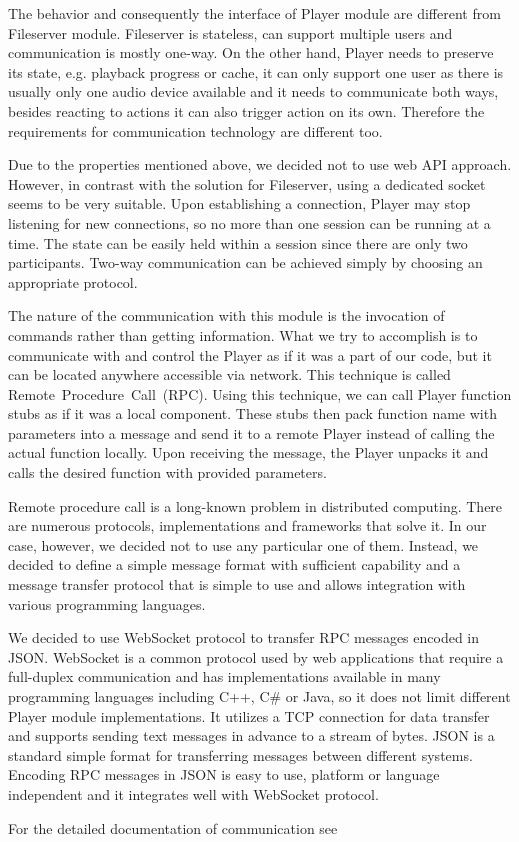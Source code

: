 The behavior and consequently the interface of Player module are different from Fileserver module. Fileserver is stateless, can support multiple users and communication is mostly one-way. On the other hand, Player needs to preserve its state, e.g. playback progress or cache, it can only support one user as there is usually only one audio device available and it needs to communicate both ways, besides reacting to actions it can also trigger action on its own. Therefore the requirements for communication technology are different too.
\par
Due to the properties mentioned above, we decided not to use web API approach. However, in contrast with the solution for Fileserver, using a dedicated socket seems to be very suitable. Upon establishing a connection, Player may stop listening for new connections, so no more than one session can be running at a time. The state can be easily held within a session since there are only two participants. Two-way communication can be achieved simply by choosing an appropriate protocol.
\par
The nature of the communication with this module is the invocation of commands rather than getting information. What we try to accomplish is to communicate with and control the Player as if it was a part of our code, but it can be located anywhere accessible via network. This technique is called Remote~Procedure~Call~(RPC). Using this technique, we can call Player function stubs as if it was a local component. These stubs then pack function name with parameters into a message and send it to a remote Player instead of calling the actual function locally. Upon receiving the message, the Player unpacks it and calls the desired function with provided parameters.
\par
Remote procedure call is a long-known problem in distributed computing. There are numerous protocols, implementations and frameworks that solve it. In our case, however, we decided not to use any particular one of them. Instead, we decided to define a simple message format with sufficient capability and a message transfer protocol that is simple to use and allows integration with various programming languages.
\par
We decided to use WebSocket protocol to transfer RPC messages encoded in JSON. WebSocket is a common protocol used by web applications that require a full-duplex communication and has implementations available in many programming languages including C++, C\# or Java, so it does not limit different Player module implementations. It utilizes a TCP connection for data transfer and supports sending text messages in advance to a stream of bytes. JSON is a standard simple format for transferring messages between different systems. Encoding RPC messages in JSON is easy to use, platform or language independent and it integrates well with WebSocket protocol.
\par
For the detailed documentation of communication see 

